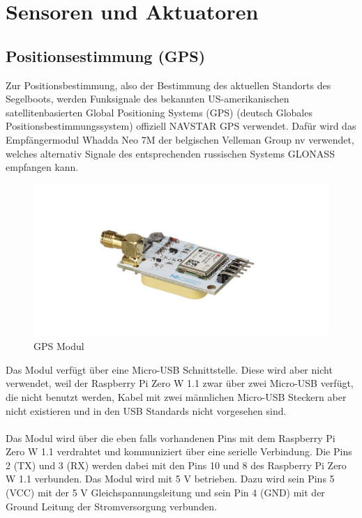 \section{Sensoren und Aktuatoren}
\subsection{Positionsestimmung (GPS)}
Zur Positionsbestimmung, also der Bestimmung des aktuellen Standorts des Segelboots, werden Funksignale des bekannten US-amerikanischen satellitenbasierten Global Positioning Systems (GPS) (deutsch Globales Positionsbestimmungssystem) offiziell NAVSTAR GPS verwendet. Dafür wird das Empfängermodul Whadda Neo 7M der belgischen Velleman Group nv verwendet, welches alternativ Signale des entsprechenden russischen Systems GLONASS empfangen kann.
\begin{figure}[H] 
    \centering
    \includegraphics[width=1\linewidth]{gps.png}
    \caption{GPS Modul}
    \label{fig:gps}
\end{figure}
Das Modul verfügt über eine Micro-USB Schnittstelle. Diese wird aber nicht verwendet, weil der Raspberry Pi Zero W 1.1 zwar über zwei Micro-USB verfügt, die nicht benutzt werden, Kabel mit zwei männlichen Micro-USB Steckern aber nicht existieren und in den USB Standards nicht vorgesehen sind. \\ \\
Das Modul wird über die eben falls vorhandenen Pins mit dem Raspberry Pi Zero W 1.1 verdrahtet und  kommuniziert über eine serielle Verbindung. Die Pins 2 (TX) und 3 (RX) werden dabei mit den Pins 10 und 8 des Raspberry Pi Zero W 1.1 verbunden. Das Modul wird mit 5 V betrieben. Dazu wird sein Pins 5 (VCC) mit der 5 V Gleichspannungsleitung und sein Pin 4 (GND) mit der Ground Leitung der Stromversorgung verbunden.   

